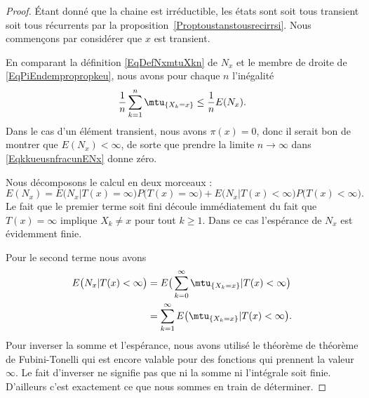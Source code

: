 \begin{proof}
	Étant donné que la chaine est irréductible, les états sont soit tous transient soit tous récurrents par la proposition~\ref{Proptoustanstousrecirrsi}. Nous commençons par considérer que \( x\) est transient.

	En comparant la définition \eqref{EqDefNxmtuXkn} de \( N_x\) et le membre de droite de \eqref{EqPiEndempropropkeu}, nous avons pour chaque \( n\) l'inégalité
	\begin{equation}    \label{EqkkueusnfracunENx}
		\frac{1}{ n }\sum_{k=1}^n\mtu_{\{ X_k=x \}}\leq\frac{1}{ n }E(N_x).
	\end{equation}
	Dans le cas d'un élément transient, nous avons \( \pi(x)=0\), donc il serait bon de montrer que \( E(N_x)<\infty\), de sorte que prendre la limite \( n\to\infty\) dans \eqref{EqkkueusnfracunENx} donne zéro.

	Nous décomposons le calcul en deux morceaux :
	\begin{equation}
		E(N_x)=E\big( N_x|T(x)=\infty \big)P\big( T(x)=\infty \big)+E\big( N_x|T(x)<\infty \big)P\big( T(x)<\infty \big).
	\end{equation}
	Le fait que le premier terme soit fini découle immédiatement du fait que \( T(x)=\infty\) implique \( X_k\neq x\) pour tout \( k\geq 1\). Dans ce cas l'espérance de \( N_x\) est évidemment finie.

	Pour le second terme nous avons
	\begin{subequations}
		\begin{align}
			E\big( N_x|T(x)<\infty \big) & =E\big( \sum_{k=0}^{\infty}\mtu_{\{ X_k=x \}}|T(x)<\infty \big)  \\
			                             & =\sum_{k=1}^{\infty}E\big( \mtu_{\{ X_k=x \}}|T(x)<\infty \big).
		\end{align}
	\end{subequations}
	Pour inverser la somme et l'espérance, nous avons utilisé le théorème de théorème de Fubini-Tonelli qui est encore valable pour des fonctions qui prennent la valeur \( \infty\). Le fait d'inverser ne signifie pas que ni la somme ni l'intégrale soit finie. D'ailleurs c'est exactement ce que nous sommes en train de déterminer.


\end{proof}
